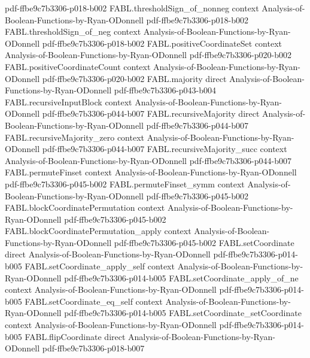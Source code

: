 \begin{theorem}
  {pdf-ffbe9c7b3306-p018-b002}
\proofstep
  {FABL.thresholdSign_of_nonneg}
  {context}
  {Analysis-of-Boolean-Functions-by-Ryan-ODonnell}
  {pdf-ffbe9c7b3306-p018-b002}
\proofstep
  {FABL.thresholdSign_of_neg}
  {context}
  {Analysis-of-Boolean-Functions-by-Ryan-ODonnell}
  {pdf-ffbe9c7b3306-p018-b002}
\proofstep
  {FABL.positiveCoordinateSet}
  {context}
  {Analysis-of-Boolean-Functions-by-Ryan-ODonnell}
  {pdf-ffbe9c7b3306-p020-b002}
\proofstep
  {FABL.positiveCoordinateCount}
  {context}
  {Analysis-of-Boolean-Functions-by-Ryan-ODonnell}
  {pdf-ffbe9c7b3306-p020-b002}
\proofstep
  {FABL.majority}
  {direct}
  {Analysis-of-Boolean-Functions-by-Ryan-ODonnell}
  {pdf-ffbe9c7b3306-p043-b004}
\proofstep
  {FABL.recursiveInputBlock}
  {context}
  {Analysis-of-Boolean-Functions-by-Ryan-ODonnell}
  {pdf-ffbe9c7b3306-p044-b007}
\proofstep
  {FABL.recursiveMajority}
  {direct}
  {Analysis-of-Boolean-Functions-by-Ryan-ODonnell}
  {pdf-ffbe9c7b3306-p044-b007}
\proofstep
  {FABL.recursiveMajority_zero}
  {context}
  {Analysis-of-Boolean-Functions-by-Ryan-ODonnell}
  {pdf-ffbe9c7b3306-p044-b007}
\proofstep
  {FABL.recursiveMajority_succ}
  {context}
  {Analysis-of-Boolean-Functions-by-Ryan-ODonnell}
  {pdf-ffbe9c7b3306-p044-b007}
\proofstep
  {FABL.permuteFinset}
  {context}
  {Analysis-of-Boolean-Functions-by-Ryan-ODonnell}
  {pdf-ffbe9c7b3306-p045-b002}
\proofstep
  {FABL.permuteFinset_symm}
  {context}
  {Analysis-of-Boolean-Functions-by-Ryan-ODonnell}
  {pdf-ffbe9c7b3306-p045-b002}
\proofstep
  {FABL.blockCoordinatePermutation}
  {context}
  {Analysis-of-Boolean-Functions-by-Ryan-ODonnell}
  {pdf-ffbe9c7b3306-p045-b002}
\proofstep
  {FABL.blockCoordinatePermutation_apply}
  {context}
  {Analysis-of-Boolean-Functions-by-Ryan-ODonnell}
  {pdf-ffbe9c7b3306-p045-b002}
\proofstep
  {FABL.setCoordinate}
  {direct}
  {Analysis-of-Boolean-Functions-by-Ryan-ODonnell}
  {pdf-ffbe9c7b3306-p014-b005}
\proofstep
  {FABL.setCoordinate_apply_self}
  {context}
  {Analysis-of-Boolean-Functions-by-Ryan-ODonnell}
  {pdf-ffbe9c7b3306-p014-b005}
\proofstep
  {FABL.setCoordinate_apply_of_ne}
  {context}
  {Analysis-of-Boolean-Functions-by-Ryan-ODonnell}
  {pdf-ffbe9c7b3306-p014-b005}
\proofstep
  {FABL.setCoordinate_eq_self}
  {context}
  {Analysis-of-Boolean-Functions-by-Ryan-ODonnell}
  {pdf-ffbe9c7b3306-p014-b005}
\proofstep
  {FABL.setCoordinate_setCoordinate}
  {context}
  {Analysis-of-Boolean-Functions-by-Ryan-ODonnell}
  {pdf-ffbe9c7b3306-p014-b005}
\proofstep
  {FABL.flipCoordinate}
  {direct}
  {Analysis-of-Boolean-Functions-by-Ryan-ODonnell}
  {pdf-ffbe9c7b3306-p018-b007}

\end{theorem}
